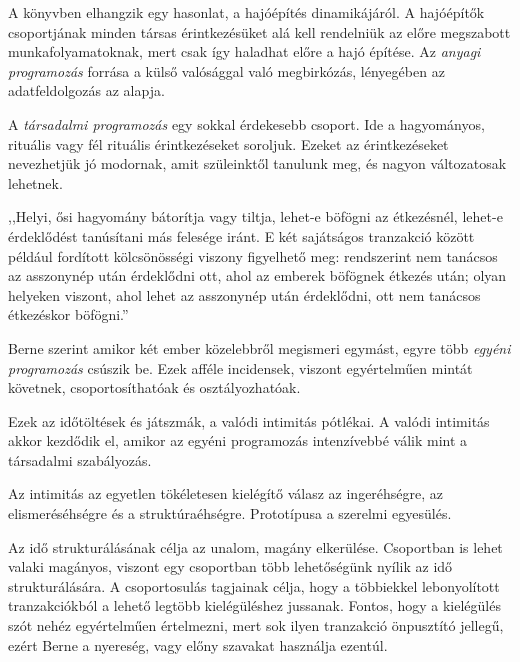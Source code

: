 \documentclass[a4paper,12pt]{article}
\begin{document}
	A könyvben elhangzik egy hasonlat, a hajóépítés dinamikájáról. A hajóépítők csoportjának minden társas érintkezésüket alá kell rendelniük az előre megszabott munkafolyamatoknak, mert csak így haladhat előre a hajó építése. Az \textit{anyagi programozás} forrása a külső valósággal való megbirkózás, lényegében az adatfeldolgozás az alapja.
	
	A \textit{társadalmi programozás} egy sokkal érdekesebb csoport. Ide a hagyományos, rituális vagy fél rituális érintkezéseket soroljuk. Ezeket az érintkezéseket nevezhetjük jó modornak, amit szüleinktől tanulunk meg, és nagyon változatosak lehetnek. 
	
	\begin{flushright}
		{\footnotesize 		,,Helyi, ősi hagyomány bátorítja  vagy  tiltja,  lehet-e  böfögni  az  étkezésnél,  lehet-e érdeklődést tanúsítani  más felesége  iránt. E két sajátságos 	tranzakció  között például fordított kölcsönösségi viszony figyelhető meg: rendszerint nem tanácsos az asszonynép után érdeklődni  ott,   ahol  az  emberek    böfögnek  étkezés  után; olyan  helyeken  viszont,  ahol  lehet az asszonynép után érdeklődni, ott nem tanácsos étkezéskor böfögni.''}
	\end{flushright}

	Berne szerint amikor két ember közelebbről megismeri egymást, egyre több \textit{egyéni programozás} csúszik be. Ezek afféle incidensek, viszont egyértelműen mintát követnek, csoportosíthatóak és osztályozhatóak.
	
	Ezek az időtöltések és játszmák, a valódi intimitás pótlékai. A valódi intimitás akkor kezdődik el, amikor az egyéni programozás intenzívebbé válik mint a társadalmi szabályozás. 
	
	\begin{flushright}
		{\footnotesize 	Az intimitás az egyetlen tökéletesen kielégítő válasz az ingeréhségre,  az  elismeréséhségre  és  a  struktúraéhségre. Prototípusa a szerelmi egyesülés.}
	\end{flushright}

	Az idő strukturálásának célja az unalom, magány elkerülése. Csoportban is lehet valaki magányos, viszont egy csoportban több lehetőségünk nyílik az idő strukturálására. A csoportosulás tagjainak célja, hogy a többiekkel lebonyolított tranzakciókból a lehető legtöbb kielégüléshez jussanak. Fontos, hogy a kielégülés szót nehéz egyértelműen értelmezni, mert sok ilyen tranzakció önpusztító jellegű, ezért Berne a nyereség, vagy előny szavakat használja ezentúl.
	
\end{document}

